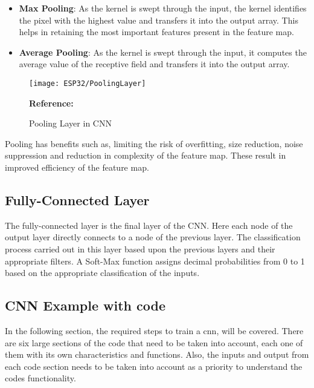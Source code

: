 \begin{itemize}
	\item \textbf{Max Pooling}:	As the kernel is swept through the input, the kernel identifies the pixel with the highest value and transfers it into the output array. This helps in retaining the most important features present in the feature map.
	\item \textbf{Average Pooling}:	As the kernel is swept through the input, it computes the average value of the receptive field and transfers it into the output array.
\end{itemize}

\begin{figure}  
	\begin{center}
		\texttt{[image: ESP32/PoolingLayer]}
		\caption{Pooling Layer in CNN} 
		\label{Pooling Layer in CNN}
		\footnotesize \textbf{Reference:} \cite{Swapna:2022}
	\end{center}
\end{figure}

Pooling has benefits such as, limiting the risk of overfitting, size reduction, noise suppression and reduction in complexity of the feature map. These result in improved efficiency of the feature map.

\subsection{Fully-Connected Layer}

The fully-connected layer is the final layer of the CNN. Here each node of the output layer directly connects to a node of the previous layer. The classification process carried out in this layer based upon the previous layers and their appropriate filters. A Soft-Max function assigns decimal probabilities from 0 to 1 based on the appropriate classification of the inputs. \cite{IBM:2020}

\subsection{CNN Example with code}

In the following section, the required steps to train a \ac{cnn}, will be covered. There are six large sections of the code that need to be taken into account, each one of them with its own characteristics and functions. Also, the inputs and output from each code section needs to be taken into account as a priority to understand the codes functionality. 

